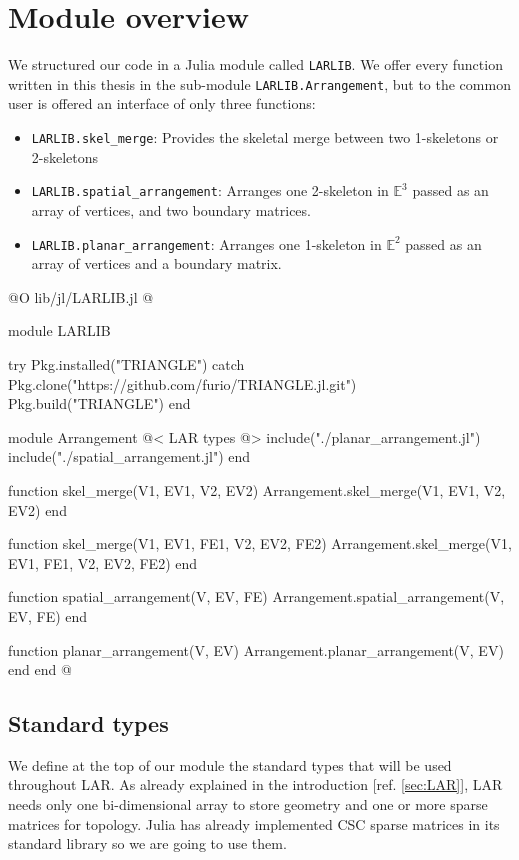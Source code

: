 \chapter{Module overview}

We structured our code in a Julia module called \texttt{LARLIB}.
We offer every function written in this thesis in the sub-module
\texttt{LARLIB.Arrangement}, but to the common user is offered
an interface of only three functions:
\begin{itemize}[noitemsep]
    \item \texttt{LARLIB.skel\_merge}: Provides the skeletal merge between two
        1-skeletons or 2-skeletons
    \item \texttt{LARLIB.spatial\_arrangement}: Arranges one 2-skeleton 
        in $\mathbb{E}^3$ passed as an array of vertices, and two boundary matrices.
    \item \texttt{LARLIB.planar\_arrangement}: Arranges one 1-skeleton 
        in $\mathbb{E}^2$ passed as an array of vertices and a boundary matrix.
\end{itemize}


@O lib/jl/LARLIB.jl
@{module LARLIB

    try
        Pkg.installed("TRIANGLE")
    catch
        Pkg.clone("https://github.com/furio/TRIANGLE.jl.git")
        Pkg.build("TRIANGLE")
    end

    module Arrangement
        @< LAR types @>
        include("./planar_arrangement.jl")
        include("./spatial_arrangement.jl")
    end

    function skel_merge(V1, EV1, V2, EV2)
        Arrangement.skel_merge(V1, EV1, V2, EV2)
    end

    function skel_merge(V1, EV1, FE1, V2, EV2, FE2)
        Arrangement.skel_merge(V1, EV1, FE1, V2, EV2, FE2)
    end

    function spatial_arrangement(V, EV, FE)
        Arrangement.spatial_arrangement(V, EV, FE)
    end

    function planar_arrangement(V, EV)
        Arrangement.planar_arrangement(V, EV)
    end
end
@}

\section{Standard types}

We define at the top of our module the standard types
that will be used throughout LAR. As already explained
in the introduction [ref. \ref{sec:LAR}], LAR needs
only one bi-dimensional array to store geometry and 
one or more sparse matrices for topology.
Julia has already implemented CSC sparse matrices in
its standard library so we are going to use them.


